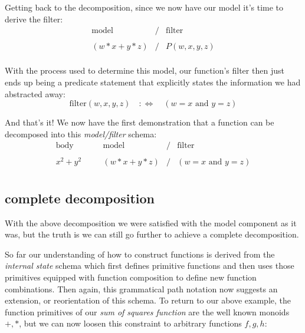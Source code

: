 \documentclass[twoside]{article}
\begin{document}
Getting back to the decomposition, since we now have our model it's time to derive the filter:
$$ \begin{array}{rcl}
\mbox{model}	& / & \mbox{filter}		\\
						\\
(w*x+y*z)	& / & P(w,x,y,z)		\\
\end{array} $$

With the process used to determine this model, our function's filter then just ends up being
a predicate statement that explicitly states the information we had abstracted away:
$$ \mbox{filter}(w,x,y,z) \quad :\Longleftrightarrow \quad (w=x\mbox{ and }y=z) $$

And that's it! We now have the first demonstration that a function
can be decomposed into this \emph{model/filter} schema:
$$ \begin{array}{lcrcl}
\mbox{body}	& \quad & \mbox{model}	& / & \mbox{filter}		\\
									\\
x^2+y^2		& \quad & (w*x+y*z)	& / & (w=x\mbox{ and }y=z)	\\
\end{array} $$

\subsection*{complete decomposition}

With the above decomposition we were satisfied with the model component as it was,
but the truth is we can still go further to achieve a complete decomposition.

So far our understanding of how to construct functions is derived from the \emph{internal state} schema which
first defines primitive functions and then uses those primitives equipped with function composition to define
new function combinations. Then again, this grammatical path notation now suggests an extension, or reorientation
of this schema. To return to our above example, the function primitives of our \emph{sum of squares function}
are the well known monoids $ +,* $, but we can now loosen this constraint to arbitrary functions $ f, g, h $:
\end{document}
